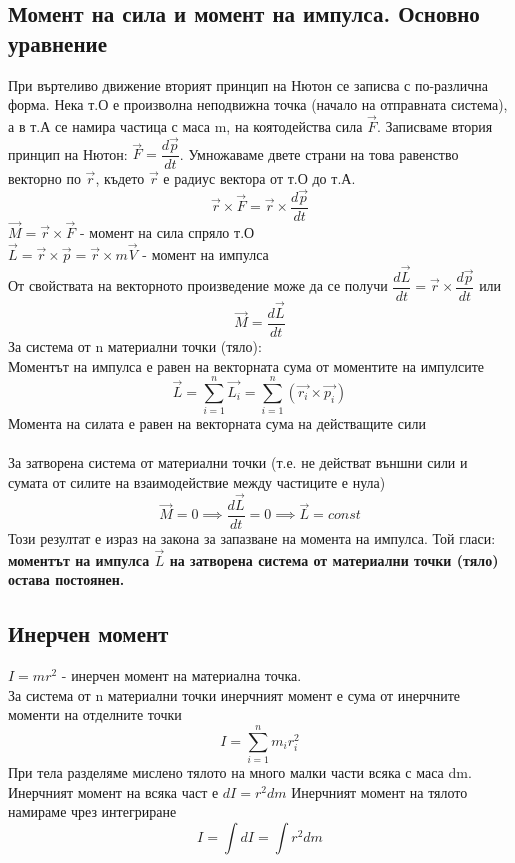 \documentclass[fleqn, 12pt]{article}
\theoremstyle{definition}
\begin{document}
\subsection{Момент на сила и момент на импулса. Основно уравнение}

При въртеливо движение вторият принцип на Нютон се записва с по-различна форма. Нека т.О е произволна неподвижна точка (начало на отправната система), а в т.А се намира частица с маса m, на коятодейства сила $\vec{F}$. Записваме втория принцип на Нютон: $\vec{F} = \dfrac{d \vec{p}}{dt}$. Умножаваме двете страни на това равенство векторно по $\vec{r}$, където $\vec{r}$ е радиус вектора от т.О до т.А. 
$$\vec{r} \times \vec{F} = \vec{r} \times \dfrac{d \vec{p}}{dt} $$
$\vec{M} = \vec{r} \times \vec{F} $ - момент на сила спряло т.О \\
$\vec{L} = \vec{r} \times \vec{p} = \vec{r} \times m\vec{V}$  - момент на импулса \\
От свойствата на векторното произведение може да се получи $\dfrac{d \vec{L}}{dt} =  \vec{r} \times \dfrac{d \vec{p}}{dt}$ или
$$\vec{M} = \dfrac{d \vec{L}}{dt}$$
За система от n материални точки (тяло): \\
Моментът на импулса е равен на векторната сума от моментите на импулсите 
$$\vec{L} = \sum_{i=1} ^n \vec{L_i} = \sum_{i=1} ^n \left( \vec{r_i} \times \vec{p_i} \right)  $$
Момента на силата е равен на векторната сума на действащите сили \\
\\
За затворена система от материални точки (т.е. не действат външни сили и сумата от силите на взаимодействие между частиците е нула) 
$$\vec{M} = 0 \implies \dfrac{d \vec{L}}{dt} = 0 \implies \vec{L} = const$$
Този резултат е израз на закона за запазване на момента на импулса. Той гласи: \textbf{моментът на импулса $\vec{L}$ на затворена система от материални точки (тяло) остава постоянен.}

\subsection{Инерчен момент}
$I = mr^2$ - инерчен момент на материална точка. \\
За система от n материални точки инерчният момент е сума от инерчните моменти на отделните точки 
$$I = \sum_{i=1} ^n m_i r_i^2$$
При тела разделяме мислено тялото на много малки части всяка с маса dm. Инерчният момент на всяка част е $dI = r^2dm$ Инерчният момент на тялото намираме чрез интегриране
$$I = \int dI = \int r^2dm $$
\end{document}
